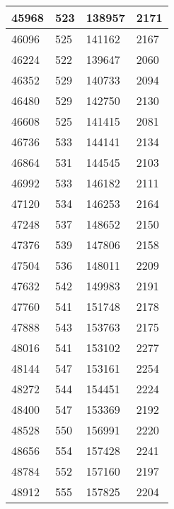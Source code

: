 \begin{longtable}{|l|l|l|l|}
		45968 & 523         & 138957          & 2171             \\ \hline
		46096 & 525         & 141162          & 2167             \\ \hline
		46224 & 522         & 139647          & 2060             \\ \hline
		46352 & 529         & 140733          & 2094             \\ \hline
		46480 & 529         & 142750          & 2130             \\ \hline
		46608 & 525         & 141415          & 2081             \\ \hline
		46736 & 533         & 144141          & 2134             \\ \hline
		46864 & 531         & 144545          & 2103             \\ \hline
		46992 & 533         & 146182          & 2111             \\ \hline
		47120 & 534         & 146253          & 2164             \\ \hline
		47248 & 537         & 148652          & 2150             \\ \hline
		47376 & 539         & 147806          & 2158             \\ \hline
		47504 & 536         & 148011          & 2209             \\ \hline
		47632 & 542         & 149983          & 2191             \\ \hline
		47760 & 541         & 151748          & 2178             \\ \hline
		47888 & 543         & 153763          & 2175             \\ \hline
		48016 & 541         & 153102          & 2277             \\ \hline
		48144 & 547         & 153161          & 2254             \\ \hline
		48272 & 544         & 154451          & 2224             \\ \hline
		48400 & 547         & 153369          & 2192             \\ \hline
		48528 & 550         & 156991          & 2220             \\ \hline
		48656 & 554         & 157428          & 2241             \\ \hline
		48784 & 552         & 157160          & 2197             \\ \hline
		48912 & 555         & 157825          & 2204             \\ \hline

\end{longtable}
